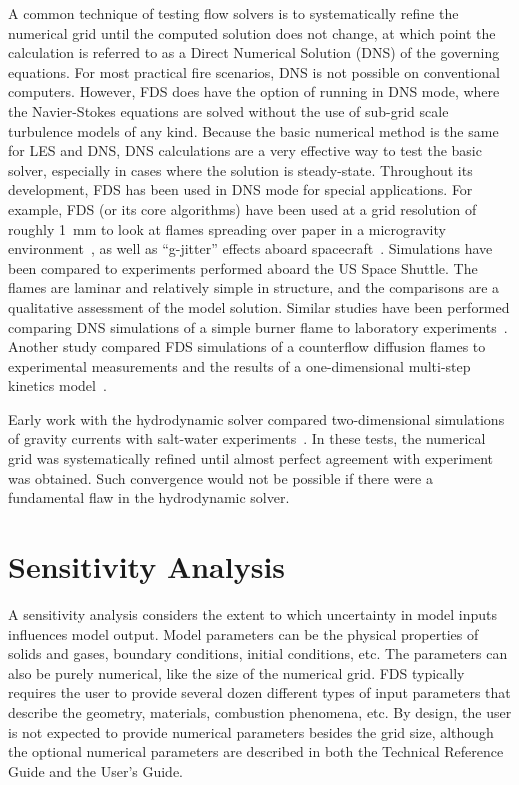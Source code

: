 \documentclass[11pt]{book}
\begin{document}
A common technique of testing flow solvers is to systematically refine the numerical grid until the computed solution does not change, at which point
the calculation is referred to as a Direct Numerical Solution (DNS) of the governing equations.  For most practical fire scenarios, DNS is not
possible on conventional computers. However, FDS does have the option of running in DNS mode, where the Navier-Stokes equations are solved without
the use of sub-grid scale turbulence models of any kind. Because the basic numerical method is the same for LES and DNS, DNS calculations are a very
effective way to test the basic solver, especially in cases where the solution is steady-state. Throughout its development, FDS has been used in DNS
mode for special applications.  For example, FDS (or its core algorithms) have been used at a grid resolution of roughly 1~mm to look at flames
spreading over paper in a microgravity environment~\cite{McGrattan:CF1996,Kashiwagi:CS1996,Mell:CS98,Mell:CS00,Prasad:CS2002,Nakamura:CF2002}, as
well as ``g-jitter'' effects aboard spacecraft~\cite{Mell:g-jitter}. Simulations have been compared to experiments performed aboard the US Space
Shuttle.  The flames are laminar and relatively simple in structure, and the comparisons are a qualitative assessment of the model solution. Similar
studies have been performed comparing DNS simulations of a simple burner flame to laboratory experiments~\cite{Mukhopadhyay:1}. Another study
compared FDS simulations of a counterflow diffusion flames to experimental measurements and the results of a one-dimensional multi-step kinetics
model~\cite{Hamins:NASA}.

Early work with the hydrodynamic solver compared two-dimensional simulations of gravity currents with salt-water experiments~\cite{McGrattan:1}. In
these tests, the numerical grid was systematically refined until almost perfect agreement with experiment was obtained. Such convergence would not be
possible if there were a fundamental flaw in the hydrodynamic solver.




\section{Sensitivity Analysis}

A sensitivity  analysis considers the  extent to which  uncertainty in model  inputs influences  model output.  Model parameters  can  be the
physical properties of solids  and gases, boundary conditions, initial conditions, etc. The parameters  can also be  purely numerical, like
the size  of the numerical grid. FDS  typically requires the user to  provide several  dozen different  types of  input  parameters that describe the
geometry, materials,  combustion phenomena, etc. By design,  the user  is  not expected  to  provide numerical  parameters besides the grid
size,  although the optional numerical parameters are described in both the Technical Reference Guide and the User's Guide.
\end{document}

